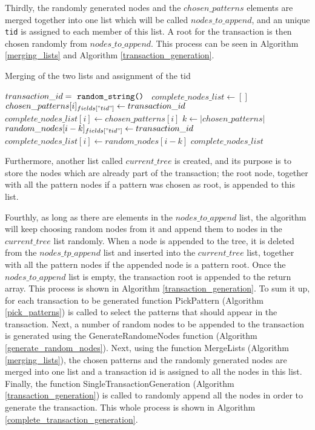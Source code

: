 \documentclass{acm_proc_article-sp-sigmod09}
\begin{document}
Thirdly, the randomly generated nodes and the $chosen\_patterns$ elements are merged together into one list which will be called $nodes\_to\_append$, and an unique \texttt{tid} is assigned to each member of this list. A root for the transaction is then chosen randomly from $nodes\_to\_append$. This process can be seen in Algorithm \ref{merging_lists} and Algorithm \ref{transaction_generation}.

\begin{algorithm}
\caption{Merging of the two lists and assignment of the tid}
\label{merging_lists}
\begin{algorithmic}[1]
\State $transaction\_id = \text{ \texttt{random\_string() }}$
\State $complete\_nodes\_list \gets []$
    \State $chosen\_patterns[i]_{fields["tid"]} \gets transaction\_id$
    \State $complete\_nodes\_list[i] \gets chosen\_patterns[i]$
\EndFor
\State $k \gets |chosen\_patterns|$
    \State $random\_nodes[i - k]_{fields["tid"]} \gets transaction\_id$
    \State $complete\_nodes\_list[i] \gets random\_nodes[i - k]$
\EndFor
\Return $complete\_nodes\_list$
\EndFunction
\end{algorithmic}
\end{algorithm}

Furthermore, another list called $current\_tree$ is created, and its purpose is to store the nodes which are already part of the transaction; the root node, together with all the pattern nodes if a pattern was chosen as root, is appended to this list.

Fourthly, as long as there are elements in the $nodes\_to\_append$ list, the algorithm will keep choosing random nodes from it and append them to nodes in the $current\_tree$ list randomly. When a node is appended to the tree, it is deleted from the $nodes\_tp\_append$ list and inserted into the $current\_tree$ list, together with all the pattern nodes if the appended node is a pattern root. Once the $nodes\_to\_append$ list is empty, the transaction root is appended to the return array. This process is shown in Algorithm \ref{transaction_generation}. To sum it up, for each transaction to be generated function PickPattern (Algorithm \ref{pick_patterns}) is called to select the patterns that should appear in the transaction. Next, a number of random nodes to be appended to the transaction is generated using the GenerateRandomeNodes function (Algorithm \ref{generate_random_nodes}). Next, using the function MergeLists (Algorithm \ref{merging_lists}), the chosen patterns and the randomly generated nodes are merged into one list and a transaction id is assigned to all the nodes in this list. Finally, the function SingleTransactionGeneration (Algorithm \ref{transaction_generation}) is called to randomly append all the nodes in order to generate the transaction. This whole process is shown in Algorithm \ref{complete_transaction_generation}.
\end{document}
